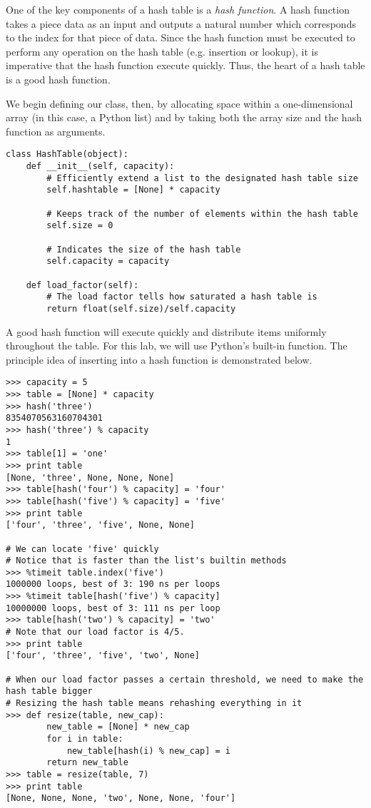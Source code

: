 One of the key components of a hash table is a \emph{hash function}.
A hash function takes a piece data as an input and outputs a natural number which corresponds to the index for that piece of data.
Since the hash function must be executed to perform any operation on the hash table (e.g. insertion or lookup), it is imperative that the hash function execute quickly.
Thus, the heart of a hash table is a good hash function.

We begin defining our  class, then, by allocating space within a one-dimensional array (in this case, a Python list) and by taking both the array size and the hash function as arguments.
\begin{lstlisting}
class HashTable(object):
    def __init__(self, capacity):
        # Efficiently extend a list to the designated hash table size
        self.hashtable = [None] * capacity

        # Keeps track of the number of elements within the hash table
        self.size = 0

        # Indicates the size of the hash table
        self.capacity = capacity

    def load_factor(self):
        # The load factor tells how saturated a hash table is
        return float(self.size)/self.capacity
\end{lstlisting}


A good hash function will execute quickly and distribute items uniformly throughout the table.
For this lab, we will use Python's built-in  function.
The principle idea of inserting into a hash function is demonstrated below.
\begin{lstlisting}
>>> capacity = 5
>>> table = [None] * capacity
>>> hash('three')
8354070563160704301
>>> hash('three') % capacity
1
>>> table[1] = 'one'
>>> print table
[None, 'three', None, None, None]
>>> table[hash('four') % capacity] = 'four'
>>> table[hash('five') % capacity] = 'five'
>>> print table
['four', 'three', 'five', None, None]

# We can locate 'five' quickly
# Notice that is faster than the list's builtin methods
>>> %timeit table.index('five')
1000000 loops, best of 3: 190 ns per loops
>>> %timeit table[hash('five') % capacity]
10000000 loops, best of 3: 111 ns per loop
>>> table[hash('two') % capacity] = 'two'
# Note that our load factor is 4/5.
>>> print table
['four', 'three', 'five', 'two', None]

# When our load factor passes a certain threshold, we need to make the hash table bigger
# Resizing the hash table means rehashing everything in it
>>> def resize(table, new_cap):
        new_table = [None] * new_cap
        for i in table:
            new_table[hash(i) % new_cap] = i
        return new_table
>>> table = resize(table, 7)
>>> print table
[None, None, None, 'two', None, None, 'four']
\end{lstlisting}

